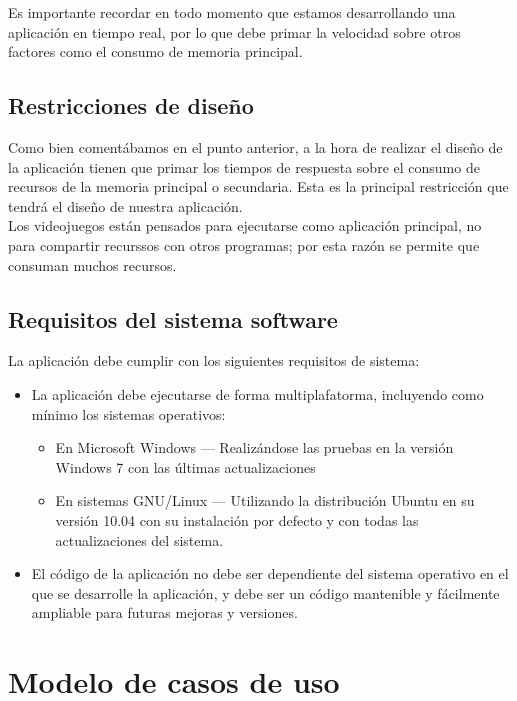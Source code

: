 Es importante recordar en todo momento que estamos desarrollando una aplicación en tiempo real, por lo que
debe primar la velocidad sobre otros factores como el consumo de memoria principal.


\subsection{Restricciones de diseño}
Como bien comentábamos en el punto anterior, a la hora de realizar el diseño de la aplicación tienen que
primar los tiempos de respuesta sobre el consumo de recursos de la memoria principal o secundaria. Esta
es la principal restricción que tendrá el diseño de nuestra aplicación.\\

Los videojuegos están pensados para ejecutarse como aplicación principal, no para compartir recurssos
con otros programas; por esta razón se permite que consuman muchos recursos.


\subsection{Requisitos del sistema software}

La aplicación debe cumplir con los siguientes requisitos de sistema:
\begin{itemize}
    \item La aplicación debe ejecutarse de forma multiplafatorma, incluyendo como mínimo los sistemas operativos:
        \begin{itemize}
            \item En Microsoft Windows --- Realizándose las pruebas en la versión Windows 7 con las últimas actualizaciones
            \item En sistemas GNU/Linux --- Utilizando la distribución Ubuntu en su versión 10.04 con su instalación
                    por defecto y con todas las actualizaciones del sistema.
        \end{itemize}
    \item El código de la aplicación no debe ser dependiente del sistema operativo en el que se desarrolle la aplicación,
            y debe ser un código mantenible y fácilmente ampliable para futuras mejoras y versiones.
\end{itemize}

\section{Modelo de casos de uso}

